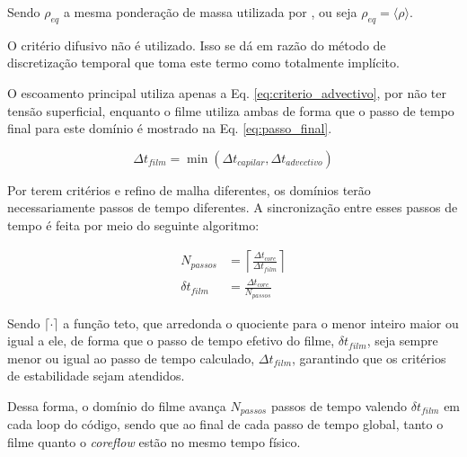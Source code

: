 Sendo $\rho_{eq}$ a mesma ponderação de massa utilizada por \citet{Brackbill1992}, ou seja $\rho_{eq} = \langle\rho\rangle$.

O critério difusivo não é utilizado. Isso se dá em razão do método de discretização temporal que toma este termo como totalmente implícito.

O escoamento principal utiliza apenas a Eq. \ref{eq:criterio_advectivo}, por não ter tensão superficial, enquanto o filme utiliza ambas de forma que o passo de tempo final para este domínio é mostrado na Eq. \ref{eq:passo_final}.

\begin{equation}
    \Delta t_{film} = \min(\Delta t_{capilar}, \Delta t_{advectivo})
    \label{eq:passo_final}
\end{equation}

Por terem critérios e refino de malha diferentes, os domínios terão necessariamente passos de tempo diferentes. A sincronização entre esses passos de tempo é feita por meio do seguinte algoritmo:

\begin{equation}
    \begin{aligned}
        N_{passos} &= \left\lceil \frac{\Delta t_{core}}{\Delta t_{film}} \right\rceil \\
        \delta t_{film} &= \frac{\Delta t_{core}}{N_{passos}}
    \end{aligned}
    \label{eq:sincronizacao_dt}
\end{equation}

Sendo $\lceil \cdot \rceil$ a função teto, que arredonda o quociente para o menor inteiro maior ou igual a ele, de forma que o passo de tempo efetivo do filme, $\delta t_{film}$, seja sempre menor ou igual ao passo de tempo calculado, $\Delta t_{film}$, garantindo que os critérios de estabilidade sejam atendidos.

Dessa forma, o domínio do filme avança $N_{passos}$ passos de tempo valendo $\delta t_{film}$ em cada loop do código, sendo que ao final de cada passo de tempo global, tanto o filme quanto o \textit{coreflow} estão no mesmo tempo físico.

